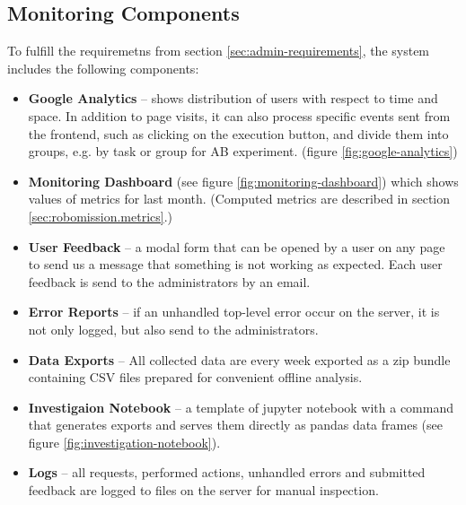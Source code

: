 \subsection{Monitoring Components}

To fulfill the requiremetns from section \ref{sec:admin-requirements},
the system includes the following components:

\begin{itemize}
\item \textbf{Google Analytics} --
  shows distribution of users with respect to time and space.
  In addition to page visits,
  it can also process specific events sent from the frontend,
  such as clicking on the execution button,
  and divide them into groups, e.g. by task or group for AB experiment.
  (figure \ref{fig:google-analytics})
\item \textbf{Monitoring Dashboard} (see figure \ref{fig:monitoring-dashboard})
      which shows values of metrics for last month.
      (Computed metrics are described in section \ref{sec:robomission.metrics}.)
\item \textbf{User Feedback} --
  a modal form that can be opened by a user on any page
  to send us a message that something is not working as expected.
  Each user feedback is send to the administrators by an email.
\item \textbf{Error Reports} --
  if an unhandled top-level error occur on the server,
  it is not only logged, but also send to the administrators.
\item \textbf{Data Exports} --
  All collected data are every week exported as a zip bundle containing
  CSV files prepared for convenient offline analysis.
\item \textbf{Investigaion Notebook} --
  a template of jupyter notebook with a command that generates exports
  and serves them directly as pandas data frames
  (see figure \ref{fig:investigation-notebook}).
\item \textbf{Logs} --
  all requests, performed actions, unhandled errors and submitted feedback are logged
  to files on the server for manual inspection.
\end{itemize}






